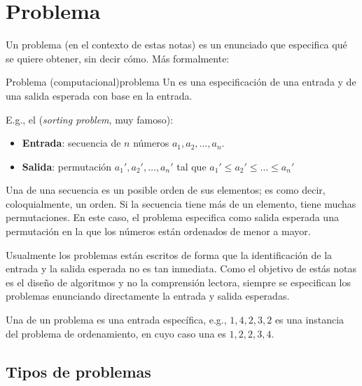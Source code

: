 \section{Problema}
\label{subsec:problema}

Un problema (en el contexto de estas notas) es un enunciado que especifica qué se quiere obtener, sin decir cómo. Más formalmente:
\begin{definicion}{Problema (computacional)}{problema}
Un  es una especificación de una entrada y de una salida esperada con base en la entrada.
\end{definicion}

E.g., el  (\textit{sorting problem}, muy famoso):
\begin{itemize}
  \item \textbf{Entrada}: secuencia de \(n\) números \(a_1, a_2,\ldots,a_n\).
  \item \textbf{Salida}: permutación \(a_1', a_2',\ldots,a_n'\) tal que \(a_1' \leq a_2' \leq \ldots \leq a_n'\)
\end{itemize}
Una  de una secuencia es un posible orden de sus elementos; es como decir, coloquialmente, un orden. Si la secuencia tiene más de un elemento, tiene muchas permutaciones. En este caso, el problema especifica como salida esperada una permutación en la que los números están ordenados de menor a mayor.

Usualmente los problemas están escritos de forma que la identificación de la entrada y la salida esperada no es tan inmediata. Como el objetivo de estás notas es el diseño de algoritmos y no la comprensión lectora, siempre se especifican los problemas enunciando directamente la entrada y salida esperadas.

Una  de un problema es una entrada específica, e.g., \(1, 4, 2, 3, 2\) es una instancia del problema de ordenamiento, en cuyo caso una  es \(1, 2, 2, 3, 4\).

\subsection{Tipos de problemas}

